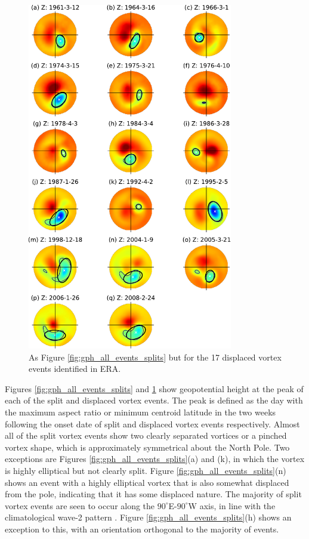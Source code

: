 \begin{figure}[htbp]
 \centering
 \noindent\includegraphics[width=0.8\textwidth]{figures/chapter-moments/GPH_all_events_displs.pdf}
 \caption[Geopotential height at the peak of displaced vortex events.]{As Figure
   \ref{fig:gph_all_events_splits} but for the 17 displaced vortex events
   identified in ERA.}
 \label{fig:gph_all_events_displs}
\end{figure}

Figures \ref{fig:gph_all_events_splits} and \ref{fig:gph_all_events_displs} show
geopotential height at the peak of each of the split and displaced vortex
events. The peak is defined as the day with the maximum aspect ratio or minimum
centroid latitude in the two weeks following the onset date of split and
displaced vortex events respectively. Almost all of the split vortex events show
two clearly separated vortices or a pinched vortex shape, which is approximately
symmetrical about the North Pole. Two exceptions are Figures
\ref{fig:gph_all_events_splits}(a) and (k), in which the vortex is highly
elliptical but not clearly split. Figure \ref{fig:gph_all_events_splits}(n)
shows an event with a highly elliptical vortex that is also somewhat displaced
from the pole, indicating that it has some displaced nature. The majority of
split vortex events are seen to occur along the $90^{\circ}$E-$90^{\circ}$W
axis, in line with the climatological wave-2 pattern \citep{Andrews1987}. Figure
\ref{fig:gph_all_events_splits}(h) shows an exception to this, with an
orientation orthogonal to the majority of events.

